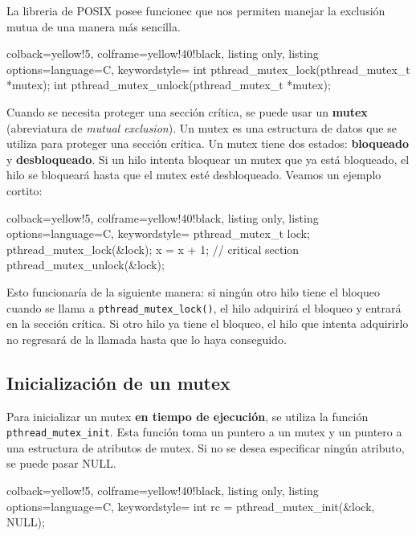 \documentclass[openany]{book}
\begin{document}
La libreria de POSIX posee funcionec que nos permiten manejar la exclusión mutua de una manera más sencilla. 

\begin{tcblisting}{colback=yellow!5, colframe=yellow!40!black, listing only, listing options={language=C, keywordstyle=\color{blue!35!white}\bfseries}}
int pthread_mutex_lock(pthread_mutex_t *mutex);
int pthread_mutex_unlock(pthread_mutex_t *mutex);
\end{tcblisting}    

Cuando se necesita proteger una sección crítica, se puede usar un \textbf{mutex} (abreviatura de \textit{mutual exclusion}). Un mutex es una estructura de datos que se utiliza para proteger una sección crítica. Un mutex tiene dos estados: \textbf{bloqueado} y \textbf{desbloqueado}. Si un hilo intenta bloquear un mutex que ya está bloqueado, el hilo se bloqueará hasta que el mutex esté desbloqueado. Veamos un ejemplo cortito:
    
\begin{tcblisting}{colback=yellow!5, colframe=yellow!40!black, listing only, listing options={language=C, keywordstyle=\color{blue!35!white}\bfseries}}
pthread_mutex_t lock;
pthread_mutex_lock(&lock);
x = x + 1; // critical section
pthread_mutex_unlock(&lock);
\end{tcblisting}  

Esto funcionaría de la siguiente manera: si ningún otro hilo tiene el bloqueo cuando se llama a \newline \texttt{pthread\_mutex\_lock()}, el hilo adquirirá el bloqueo y entrará en la sección crítica. Si otro hilo ya tiene el bloqueo, el hilo que intenta adquirirlo no regresará de la llamada hasta que lo haya conseguido.

\subsection{Inicialización de un mutex}
Para inicializar un mutex \textbf{en tiempo de ejecución}, se utiliza la función \texttt{pthread\_mutex\_init}. Esta función toma un puntero a un mutex y un puntero a una estructura de atributos de mutex. Si no se desea especificar ningún atributo, se puede pasar NULL.

\begin{tcblisting}{colback=yellow!5, colframe=yellow!40!black, listing only, listing options={language=C, keywordstyle=\color{blue!35!white}\bfseries}}
int rc = pthread_mutex_init(&lock, NULL);    
\end{tcblisting}
\end{document}
